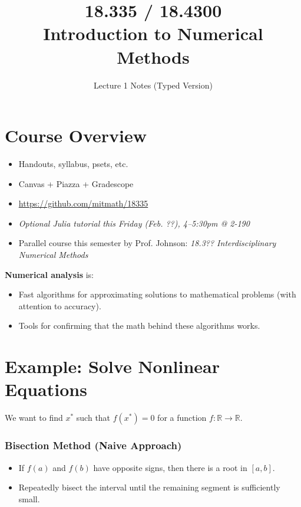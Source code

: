 \documentclass[12pt]{article}
\begin{document}
\title{18.335 / 18.4300 \\ Introduction to Numerical Methods}
\author{Lecture 1 Notes (Typed Version)}
\date{}
\maketitle

\section*{Course Overview}
\begin{itemize}
    \item Handouts, syllabus, psets, etc.
    \item Canvas + Piazza + Gradescope
    \item \url{https://github.com/mitmath/18335}
    \item \textit{Optional Julia tutorial this Friday (Feb. ??), 4--5:30pm @ 2-190}
    \item Parallel course this semester by Prof. Johnson: \textit{18.3?? Interdisciplinary Numerical Methods}
\end{itemize}

\noindent
\textbf{Numerical analysis} is:
\begin{itemize}
    \item Fast algorithms for approximating solutions to mathematical problems (with attention to accuracy).
    \item Tools for confirming that the math behind these algorithms works.
\end{itemize}

\section*{Example: Solve Nonlinear Equations}
We want to find $x^*$ such that $f(x^*) = 0$ for a function $f: \mathbb{R} \to \mathbb{R}$.

\subsubsection*{Bisection Method (Naive Approach)}
\begin{itemize}
    \item If $f(a)$ and $f(b)$ have opposite signs, then there is a root in $[a, b]$.
    \item Repeatedly bisect the interval until the remaining segment is sufficiently small.
\end{itemize}
\end{document}
